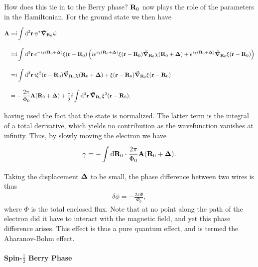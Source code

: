 How does this tie in to the Berry phase? $\vb{R}_{0}$ now plays the role of the parameters in the Hamiltonian. For the ground state we then have
\begin{align*}
	\vb{A} =& i\int\limits_{}^{}\dd[3]{\vb{r}}\psi^{\star}\grad_{\vb{R}_{0}}\psi \\
	       =& i\int\limits_{}^{}\dd[3]{\vb{r}}e^{-i\chi(\vb{R}_{0} + \vb*{\Delta})}\xi(\vb{r} - \vb{R}_{0})\left(ie^{i\chi(\vb{R}_{0} + \vb*{\Delta})}\xi(\vb{r} - \vb{R}_{0})\grad_{\vb{R}_{0}}\chi(\vb{R}_{0} + \vb*{\Delta}) + e^{i\chi(\vb{R}_{0} + \vb*{\Delta})}\grad_{\vb{R}_{0}}\xi(\vb{r} - \vb{R}_{0})\right) \\
	       =& i\int\limits_{}^{}\dd[3]{\vb{r}}i\xi^{2}(\vb{r} - \vb{R}_{0})\grad_{\vb{R}_{0}}\chi(\vb{R}_{0} + \vb*{\Delta}) + \xi(\vb{r} - \vb{R}_{0})\grad_{\vb{R}_{0}}\xi(\vb{r} - \vb{R}_{0}) \\
	       =& -\frac{2\pi}{\Phi_{0}}\vb{A}(\vb{R}_{0} + \vb*{\Delta}) + \frac{1}{2}i\int\limits_{}^{}\dd[3]{\vb{r}}\grad_{\vb{R}_{0}}\xi^{2}(\vb{r} - \vb{R}_{0}),
\end{align*}
having used the fact that the state is normalized. The latter term is the integral of a total derivative, which yields no contribution as the wavefunction vanishes at infinity. Thus, by slowly moving the electron we have
\begin{align*}
	\gamma = -\int\limits_{}^{}\dd{\vb{R}_{0}}\cdot\frac{2\pi}{\Phi_{0}}\vb{A}(\vb{R}_{0} + \vb*{\Delta}).
\end{align*}
Taking the displacement $\vb*{\Delta}$ to be small, the phase difference between two wires is thus
\begin{align*}
	\delta\phi = -\frac{2\pi\Phi}{\Phi_{0}},
\end{align*}
where $\Phi$ is the total enclosed flux. Note that at no point along the path of the electron did it have to interact with the magnetic field, and yet this phase difference arises. This effect is thus a pure quantum effect, and is termed the Aharanov-Bohm effect.

\paragraph{Spin-$\frac{1}{2}$ Berry Phase}

